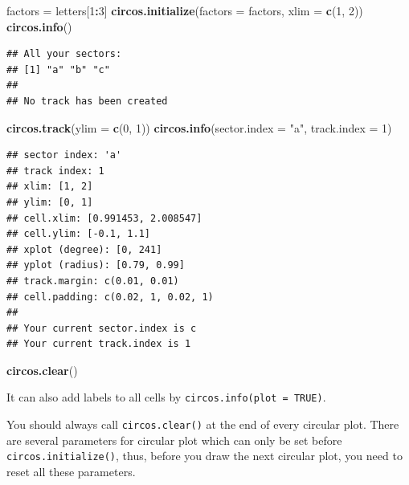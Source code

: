 \documentclass[]{book}
\newenvironment{Shaded}{\begin{snugshade}}{\end{snugshade}}
\newcommand{\KeywordTok}[1]{\textcolor[rgb]{0.13,0.29,0.53}{\textbf{#1}}}
\newcommand{\DataTypeTok}[1]{\textcolor[rgb]{0.13,0.29,0.53}{#1}}
\newcommand{\DecValTok}[1]{\textcolor[rgb]{0.00,0.00,0.81}{#1}}
\newcommand{\StringTok}[1]{\textcolor[rgb]{0.31,0.60,0.02}{#1}}
\newcommand{\OperatorTok}[1]{\textcolor[rgb]{0.81,0.36,0.00}{\textbf{#1}}}
\newcommand{\NormalTok}[1]{#1}
\theoremstyle{definition}
\theoremstyle{definition}
\theoremstyle{remark}
\begin{document}
\begin{Shaded}
\begin{Highlighting}[]
\NormalTok{factors =}\StringTok{ }\NormalTok{letters[}\DecValTok{1}\OperatorTok{:}\DecValTok{3}\NormalTok{]}
\KeywordTok{circos.initialize}\NormalTok{(}\DataTypeTok{factors =}\NormalTok{ factors, }\DataTypeTok{xlim =} \KeywordTok{c}\NormalTok{(}\DecValTok{1}\NormalTok{, }\DecValTok{2}\NormalTok{))}
\KeywordTok{circos.info}\NormalTok{()}
\end{Highlighting}
\end{Shaded}

\begin{verbatim}
## All your sectors:
## [1] "a" "b" "c"
## 
## No track has been created
\end{verbatim}

\begin{Shaded}
\begin{Highlighting}[]
\KeywordTok{circos.track}\NormalTok{(}\DataTypeTok{ylim =} \KeywordTok{c}\NormalTok{(}\DecValTok{0}\NormalTok{, }\DecValTok{1}\NormalTok{))}
\KeywordTok{circos.info}\NormalTok{(}\DataTypeTok{sector.index =} \StringTok{"a"}\NormalTok{, }\DataTypeTok{track.index =} \DecValTok{1}\NormalTok{)}
\end{Highlighting}
\end{Shaded}

\begin{verbatim}
## sector index: 'a'
## track index: 1
## xlim: [1, 2]
## ylim: [0, 1]
## cell.xlim: [0.991453, 2.008547]
## cell.ylim: [-0.1, 1.1]
## xplot (degree): [0, 241]
## yplot (radius): [0.79, 0.99]
## track.margin: c(0.01, 0.01)
## cell.padding: c(0.02, 1, 0.02, 1)
## 
## Your current sector.index is c
## Your current track.index is 1
\end{verbatim}

\begin{Shaded}
\begin{Highlighting}[]
\KeywordTok{circos.clear}\NormalTok{()}
\end{Highlighting}
\end{Shaded}

It can also add labels to all cells by
\texttt{circos.info(plot\ =\ TRUE)}.

You should always call \texttt{circos.clear()} at the end of every
circular plot. There are several parameters for circular plot which can
only be set before \texttt{circos.initialize()}, thus, before you draw
the next circular plot, you need to reset all these parameters.
\end{document}
